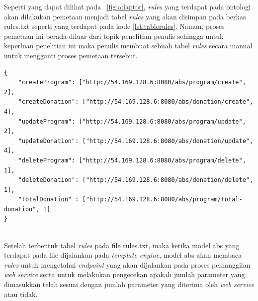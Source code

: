 Seperti yang dapat dilihat pada \pic~\ref{fig:adaptor}, \textit{rules} yang terdapat pada ontologi akan dilakukan pemetaan menjadi tabel \textit{rules} yang akan disimpan pada berkas rules.txt seperti yang terdapat pada kode \ref{lst:tablerules}. Namun, proses pemetaan ini berada diluar dari topik penelitian penulis sehingga untuk keperluan penelitian ini maka penulis membuat sebuah tabel \textit{rules} secara manual untuk mengganti proses pemetaan tersebut.

\begin{minipage}{\linewidth}
\begin{lstlisting}[caption={Contoh tabel \textit{rules}},label={lst:tablerules}]
{
	"createProgram": ["http://54.169.128.6:8080/abs/program/create", 2],
	"createDonation": ["http://54.169.128.6:8080/abs/donation/create", 4],
	"updateProgram": ["http://54.169.128.6:8080/abs/program/update", 2],
	"updateDonation": ["http://54.169.128.6:8080/abs/donation/update", 4],
	"deleteProgram": ["http://54.169.128.6:8080/abs/program/delete", 1],
	"deleteDonation": ["http://54.169.128.6:8080/abs/donation/delete", 1],
	"totalDonation" : ["http://54.169.128.6:8080/abs/program/total-donation", 1]
}
\end{lstlisting}
\end{minipage} \\

Setelah terbentuk tabel \textit{rules} pada file rules.txt, maka ketika model abs yang terdapat pada file dijalankan pada \textit{template engine}, model abs akan membaca \textit{rules} untuk mengetahui \textit{endpoint} yang akan dijalankan pada proses pemanggilan \textit{web service} serta untuk melakukan pengecekan apakah jumlah parameter yang dimasukkan telah sesuai dengan jumlah parameter yang diterima oleh \textit{web service} atau tidak.